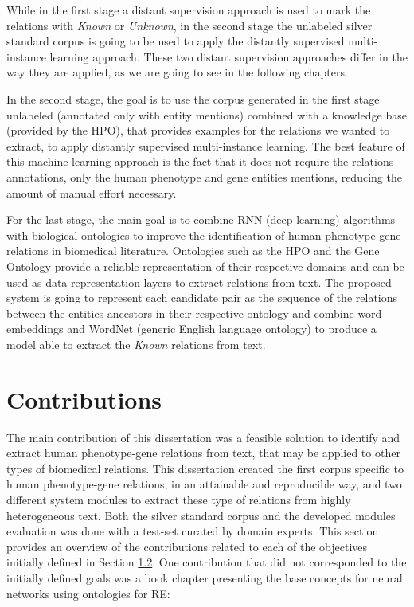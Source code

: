 While in the first stage a distant supervision approach is used to mark the relations with \textit{Known} or \textit{Unknown}, in the second stage the unlabeled silver standard corpus is going to be used to apply the distantly supervised multi-instance learning approach. These two distant supervision approaches differ in the way they are applied, as we are going to see in the following chapters.  

In the second stage, the goal is to use the corpus generated in the first stage unlabeled (annotated only with entity mentions) combined with a knowledge base (provided by the HPO), that provides examples for the relations we wanted to extract, to apply distantly supervised multi-instance learning. The best feature of this machine learning approach is the fact that it does not require the relations annotations, only the human phenotype and gene entities mentions, reducing the amount of manual effort necessary.

For the last stage, the main goal is to combine RNN (deep learning) algorithms with biological ontologies to improve the identification of human phenotype-gene relations in biomedical literature. Ontologies such as the HPO and the Gene Ontology provide a reliable representation of their respective domains and can be used as data representation layers to extract relations from text. The proposed system is going to represent each candidate pair as the sequence of the relations between the entities ancestors in their respective ontology and combine word embeddings and WordNet (generic English language ontology) to produce a model able to extract the \textit{Known} relations from text.


\hypertarget{1.4}{\section{Contributions}}

The main contribution of this dissertation was a feasible solution to identify and extract human phenotype-gene relations from text, that may be applied to other types of biomedical relations. This dissertation created the first corpus specific to human phenotype-gene relations, in an attainable and reproducible way, and two different system modules to extract these type of relations from highly heterogeneous text. Both the silver standard corpus and the developed modules evaluation was done with a test-set curated by domain experts. This section provides an overview of the contributions related to each of the objectives initially defined in Section \hyperlink{1.2}{1.2}. One contribution that did not corresponded to the initially defined goals was a book chapter presenting the base concepts for neural networks using ontologies for RE:

